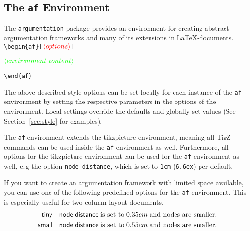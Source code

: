 \documentclass[headings=normal]{scrartcl}
\newcommand{\tikzname}{Ti\emph{k}Z\xspace}
\newcommand{\argumentation}{\texttt{argumentation}\xspace}
\newcommand{\opt}[2][red]{\ensuremath{\textcolor{#1}{\langle #2\rangle}}}
\newtheorem{example}{Example}
\begin{document}
\subsection{The \texttt{af} Environment}\label{sec:af}
The \argumentation package provides an environment for creating abstract argumentation frameworks and many of its extensions in \LaTeX-documents.\\

\vspace{-0.2cm}
\noindent
\verb|\begin{af}[|\opt{options}\verb|]|

\opt[green]{environment~content}

\noindent
\verb|\end{af}|

\begin{list}{}{\leftmargin=\parindent\rightmargin=0pt}
    \item
    The above described style options can be set locally for each instance of the \texttt{af} environment by setting the respective parameters in the options of the environment.
    Local settings override the defaults and globally set values (See Section~\ref{sec:style} 
 for examples).
    
    The \texttt{af} environment extends the \textsf{tikzpicture} environment, meaning all \tikzname commands can be used inside the \texttt{af} environment as well.
    Furthermore, all options for the \textsf{tikzpicture} environment can be used for the \texttt{af} environment as well, e.\,g the option \verb|node distance|, which is set to \verb|1cm| (\verb|6.6ex|) per default.

    If you want to create an argumentation framework with limited space available, you can use one of the following predefined options for the \texttt{af} environment. 
    This is especially useful for two-column layout documents.
    \begin{align*}
        \mathsf{tiny} &\quad \text{\textsf{node distance} is set to $0.35cm$ and nodes are smaller.}\\
        \mathsf{small} &\quad \text{\textsf{node distance} is set to $0.55cm$ and nodes are smaller.}
    \end{align*}

\end{list}
\end{document}
